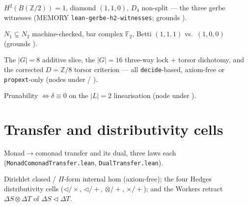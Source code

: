 \documentclass[11pt]{article}
\begin{document}
\begin{theorem}
$H^2(B(ℤ/2))=1$, diamond $(1,1,0)$, $D_4$ non-split --- the three gerbe witnesses (MEMORY
\texttt{lean-gerbe-h2-witnesses}; grounds ).
\end{theorem}

\begin{theorem}
$N_1\subsetneq N_2$ machine-checked, bar complex $𝔽_2$, Betti $(1,1,1)$ vs.\ $(1,0,0)$ (grounds
).
\end{theorem}

\begin{theorem}
The $|G|=8$ additive slice, the $|G|=16$ three-way lock $+$ torsor dichotomy, and the corrected
$D=ℤ/8$ torsor criterion --- all \texttt{decide}-based, axiom-free or \texttt{propext}-only (nodes
under  / ).
\end{theorem}

\begin{theorem}
Prunability $\iff δ\equiv0$ on the $|L|=2$ linearisation (node under ).
\end{theorem}

\section{Transfer and distributivity cells}
\begin{theorem}
Monad$\to$comonad transfer and its dual, three laws each (\texttt{MonadComonadTransfer.lean},
\texttt{DualTransfer.lean}).
\end{theorem}
\begin{theorem}
Dirichlet closed / $Π$-form internal hom (axiom-free); the four Hedges distributivity cells
($\triangleleft/\times$, $\triangleleft/+$, $\otimes/+$, $\times/+$); and the Workers retract
$ΔS\otimes ΔT$ of $ΔS\triangleleft ΔT$.
\end{theorem}
\end{document}
